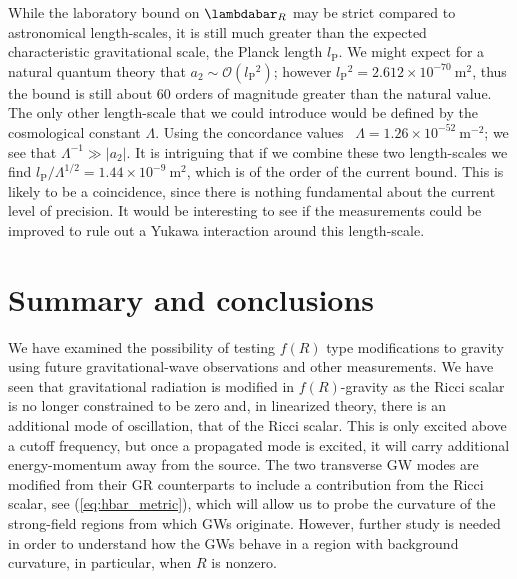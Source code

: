 \documentclass[aps,prd,amsfonts,amssymb,amsmath,nofootinbib,reprint,showpacs]{revtex4-1}
\newcommand{\eqnref}[1]{(\ref{eq:#1})}
\newcommand{\units}[1]{\ensuremath{~\mathrm{#1}}}
\newcommand{\sub}[1]{\ensuremath{_\text{#1}}}
\newcommand{\order}[1]{\ensuremath{\mathcal{O}({#1})}}
\begin{document}
While the laboratory bound on $\lambdabar_R$ may be strict compared to astronomical length-scales, it is still much greater than the expected characteristic gravitational scale, the Planck length $l\sub{P}$. We might expect for a natural quantum theory that $a_2 \sim \order{l\sub{P}^2}$; however $l\sub{P}^2 = 2.612 \times 10^{-70}\units{m^2}$, thus the bound is still about $60$ orders of magnitude greater than the natural value. The only other length-scale that we could introduce would be defined by the cosmological constant $\Lambda$. Using the concordance values~\cite{Jarosik2011} $\Lambda = 1.26 \times 10^{-52}\units{m^{-2}}$; we see that $\Lambda^{-1} \gg |a_2|$. It is intriguing that if we combine these two length-scales we find ${l\sub{P}}/{\Lambda^{1/2}} = 1.44 \times 10^{-9}\units{m^2}$, which is of the order of the current bound. This is likely to be a coincidence, since there is nothing fundamental about the current level of precision. It would be interesting to see if the measurements could be improved to rule out a Yukawa interaction around this length-scale.

\section{Summary and conclusions\label{sec:f_Discuss}}

We have examined the possibility of testing $f(R)$ type modifications to gravity using future gravitational-wave observations and other measurements. We have seen that gravitational radiation is modified in $f(R)$-gravity as the Ricci scalar is no longer constrained to be zero and, in linearized theory, there is an additional mode of oscillation, that of the Ricci scalar. This is only excited above a cutoff frequency, but once a propagated mode is excited, it will carry additional energy-momentum away from the source. The two transverse GW modes are modified from their GR counterparts to include a contribution from the Ricci scalar, see \eqnref{hbar_metric}, which will allow us to probe the curvature of the strong-field regions from which GWs originate. However, further study is needed in order to understand how the GWs behave in a region with background curvature, in particular, when $R$ is nonzero.
\end{document}

